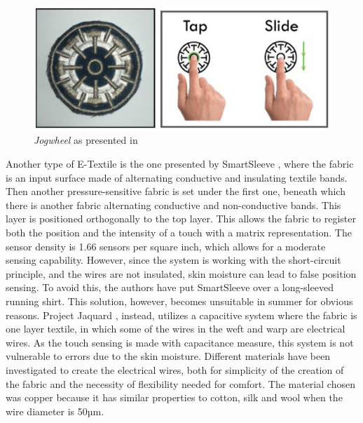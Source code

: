 \documentclass{sigchi}
\begin{document}
\begin{figure}
  \includegraphics[width=\columnwidth]{jogwheel.png}
  \caption{\emph{Jogwheel} as presented in \protect\cite{touch-wrist}}
  \label{fig:1}
\end{figure}
%
%
Another type of E-Textile is the one presented by SmartSleeve \cite{smart-sleeve}, where the fabric is an input surface made of alternating conductive and insulating textile bands. Then another pressure-sensitive fabric is set under the first one, beneath which there is another fabric alternating conductive and non-conductive bands. This layer is positioned orthogonally to the top layer. This allows the fabric to register both the position and the intensity of a touch with a matrix representation. The sensor density is 1.66 sensors per square inch, which allows for a moderate sensing capability. However, since the system is working with the short-circuit principle, and the wires are not insulated, skin moisture can lead to false position sensing. To avoid this, the authors have put SmartSleeve over a long-sleeved running shirt. This solution, however, becomes unsuitable in summer for obvious reasons. %
%
Project Jaquard \cite{jacquard}, instead, utilizes a capacitive system where the fabric is one layer textile, in which some of the wires in the weft and warp are electrical wires. As the touch sensing is made with capacitance measure, this system is not vulnerable to errors due to the skin moisture. Different materials have been investigated to create the electrical wires, both for simplicity of the creation of the fabric and the necessity of flexibility needed for comfort. The material chosen was copper because it has similar properties to cotton, silk and wool when the wire diameter is 50µm.
%
\end{document}
